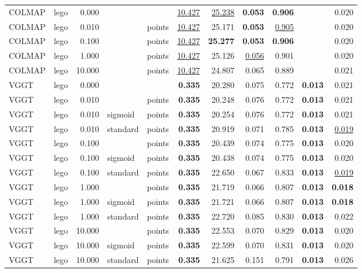 \begin{table}[H]
\begin{tabular}{llrllrrrrrr}
\midrule
COLMAP & lego & 0.000 &  &  & \underline{10.427} & \underline{25.238} & \textbf{0.053} & \textbf{0.906} &  & 0.020 \\
COLMAP & lego & 0.010 &  & points & \underline{10.427} & 25.171 & \textbf{0.053} & \underline{0.905} &  & 0.020 \\
COLMAP & lego & 0.100 &  & points & \underline{10.427} & \textbf{25.277} & \textbf{0.053} & \textbf{0.906} &  & 0.020 \\
COLMAP & lego & 1.000 &  & points & \underline{10.427} & 25.126 & \underline{0.056} & 0.901 &  & 0.020 \\
COLMAP & lego & 10.000 &  & points & \underline{10.427} & 24.807 & 0.065 & 0.889 &  & 0.021 \\
VGGT & lego & 0.000 &  &  & \textbf{0.335} & 20.280 & 0.075 & 0.772 & \textbf{0.013} & 0.021 \\
VGGT & lego & 0.010 &  & points & \textbf{0.335} & 20.248 & 0.076 & 0.772 & \textbf{0.013} & 0.021 \\
VGGT & lego & 0.010 & sigmoid & points & \textbf{0.335} & 20.254 & 0.076 & 0.772 & \textbf{0.013} & 0.021 \\
VGGT & lego & 0.010 & standard & points & \textbf{0.335} & 20.919 & 0.071 & 0.785 & \textbf{0.013} & \underline{0.019} \\
VGGT & lego & 0.100 &  & points & \textbf{0.335} & 20.439 & 0.074 & 0.775 & \textbf{0.013} & 0.020 \\
VGGT & lego & 0.100 & sigmoid & points & \textbf{0.335} & 20.438 & 0.074 & 0.775 & \textbf{0.013} & 0.020 \\
VGGT & lego & 0.100 & standard & points & \textbf{0.335} & 22.650 & 0.067 & 0.833 & \textbf{0.013} & \underline{0.019} \\
VGGT & lego & 1.000 &  & points & \textbf{0.335} & 21.719 & 0.066 & 0.807 & \textbf{0.013} & \textbf{0.018} \\
VGGT & lego & 1.000 & sigmoid & points & \textbf{0.335} & 21.721 & 0.066 & 0.807 & \textbf{0.013} & \textbf{0.018} \\
VGGT & lego & 1.000 & standard & points & \textbf{0.335} & 22.720 & 0.085 & 0.830 & \textbf{0.013} & 0.022 \\
VGGT & lego & 10.000 &  & points & \textbf{0.335} & 22.553 & 0.070 & 0.829 & \textbf{0.013} & 0.020 \\
VGGT & lego & 10.000 & sigmoid & points & \textbf{0.335} & 22.599 & 0.070 & 0.831 & \textbf{0.013} & 0.020 \\
VGGT & lego & 10.000 & standard & points & \textbf{0.335} & 21.625 & 0.151 & 0.791 & \textbf{0.013} & 0.026 \\
\bottomrule
\end{tabular}
\end{table}